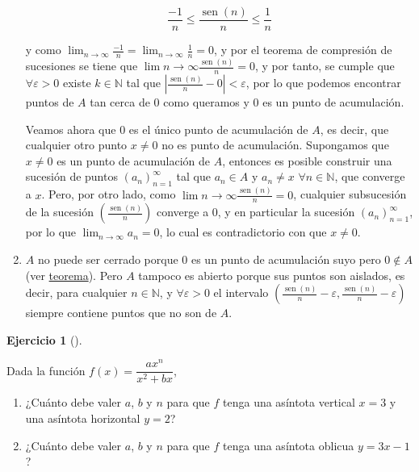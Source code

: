 \documentclass[
  a4paper,
]{scrreport}
\providecommand{\tightlist}{%
  \setlength{\itemsep}{0pt}\setlength{\parskip}{0pt}}\usepackage{longtable,booktabs,array}
\theoremstyle{definition}
\newtheorem{exercise}{Ejercicio}[chapter]
\theoremstyle{remark}
\begin{document}
\begin{tcolorbox}
\begin{enumerate}
  \[
  \frac{-1}{n}\leq \frac{\operatorname{sen}(n)}{n}\leq \frac{1}{n}
  \]

  y como
  \(\lim_{n\to\infty} \frac{-1}{n}=\lim_{n\to\infty} \frac{1}{n} = 0\),
  y por el teorema de compresión de sucesiones se tiene que
  \(\lim{n\to \infty}\frac{\operatorname{sen}(n)}{n} = 0\), y por tanto,
  se cumple que \(\forall \varepsilon>0\) existe \(k\in\mathbb{N}\) tal
  que
  \(\left|\frac{\operatorname{sen}(n)}{n} - 0 \right| < \varepsilon\),
  por lo que podemos encontrar puntos de \(A\) tan cerca de \(0\) como
  queramos y \(0\) es un punto de acumulación.

  Veamos ahora que \(0\) es el único punto de acumulación de \(A\), es
  decir, que cualquier otro punto \(x\neq 0\) no es punto de
  acumulación. Supongamos que \(x\neq 0\) es un punto de acumulación de
  \(A\), entonces es posible construir una sucesión de puntos
  \((a_n)_{n=1}^\infty\) tal que \(a_n\in A\) y \(a_n\neq x\)
  \(\forall n\in \mathbb{N}\), que converge a \(x\). Pero, por otro
  lado, como \(\lim{n\to \infty}\frac{\operatorname{sen}(n)}{n} = 0\),
  cualquier subsucesión de la sucesión
  \(\left(\frac{\operatorname{sen}(n)}{n}\right)\) converge a \(0\), y
  en particular la sucesión \((a_n)_{n=1}^\infty\), por lo que
  \(\lim_{n\to\infty} a_n = 0\), lo cual es contradictorio con que
  \(x\neq 0\).
\item
  \(A\) no puede ser cerrado porque \(0\) es un punto de acumulación
  suyo pero \(0\not\in A\) (ver
  \href{https://aprendeconalf.es/analisis-manual/03-topologia-reales.html\#thm-conjunto-cerrado-puntos-acumulacion}{teorema}).
  Pero \(A\) tampoco es abierto porque sus puntos son aislados, es
  decir, para cualquier \(n\in\mathbb{N}\), y \(\forall \varepsilon>0\)
  el intervalo
  \(\left(\frac{\operatorname{sen}(n)}{n}-\varepsilon, \frac{\operatorname{sen}(n)}{n}-\varepsilon\right)\)
  siempre contiene puntos que no son de \(A\).
\end{enumerate}

\end{tcolorbox}

\begin{exercise}[]\protect\hypertarget{exr-4}{}\label{exr-4}

Dada la función \(f(x)=\dfrac{ax^n}{x^2+bx}\),

\begin{enumerate}
\def\labelenumi{\alph{enumi}.}
\tightlist
\item
  ¿Cuánto debe valer \(a\), \(b\) y \(n\) para que \(f\) tenga una
  asíntota vertical \(x=3\) y una asíntota horizontal \(y=2\)?
\item
  ¿Cuánto debe valer \(a\), \(b\) y \(n\) para que \(f\) tenga una
  asíntota oblicua \(y=3x-1\)?
\end{enumerate}

\end{exercise}
\end{document}
